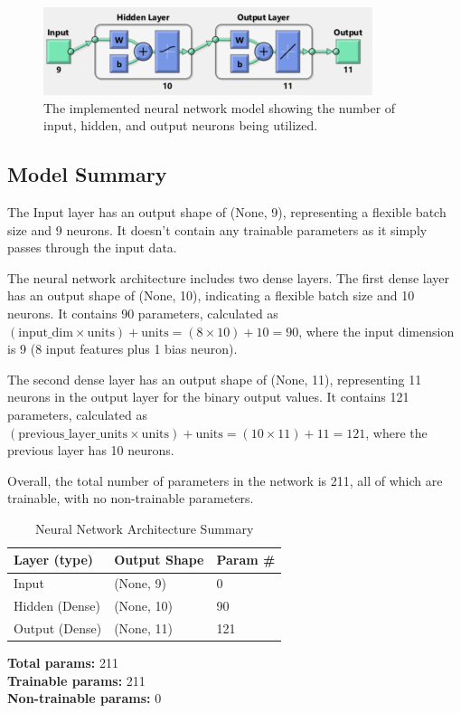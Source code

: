 \begin{figure}[!htpb]
    \centering
    \includegraphics[width=\linewidth]{Figures/Neural Network.png}
    \caption{The implemented neural network model showing the number of input, hidden, and output neurons being utilized.}
\end{figure}

\subsection{Model Summary}
The Input layer has an output shape of (None, 9), representing a flexible batch size and 9 neurons. It doesn't contain any trainable parameters as it simply passes through the input data.

The neural network architecture includes two dense layers. The first dense layer has an output shape of (None, 10), indicating a flexible batch size and 10 neurons. It contains 90 parameters, calculated as $(\text{input\_dim} \times \text{units}) + \text{units} = (8 \times 10) + 10 = 90$, where the input dimension is 9 (8 input features plus 1 bias neuron).

The second dense layer has an output shape of (None, 11), representing 11 neurons in the output layer for the binary output values. It contains 121 parameters, calculated as $(\text{previous\_layer\_units} \times \text{units}) + \text{units} = (10 \times 11) + 11 = 121$, where the previous layer has 10 neurons.

Overall, the total number of parameters in the network is 211, all of which are trainable, with no non-trainable parameters.

\begin{table}[h]
\centering
\normalsize %
\begin{tabular}{|l|l|l|}
\hline
\textbf{Layer (type)} & \textbf{Output Shape} & \textbf{Param \#} \\ \hline
Input & (None, 9) & 0 \\ \hline
Hidden (Dense) & (None, 10) & 90 \\ \hline
Output (Dense) & (None, 11) & 121 \\ \hline
\end{tabular}
\vspace{0.5cm}

\small{
\raggedright{
\hspace{0.8cm}\textbf{Total params:} 211 \\
\hspace{0.8cm}\textbf{Trainable params:} 211 \\
\hspace{-3.5cm}\textbf{Non-trainable params:} 0
}
}
\vspace{0.5cm}
\caption{Neural Network Architecture Summary}
\label{tab:neural_network_architecture}
\end{table}

